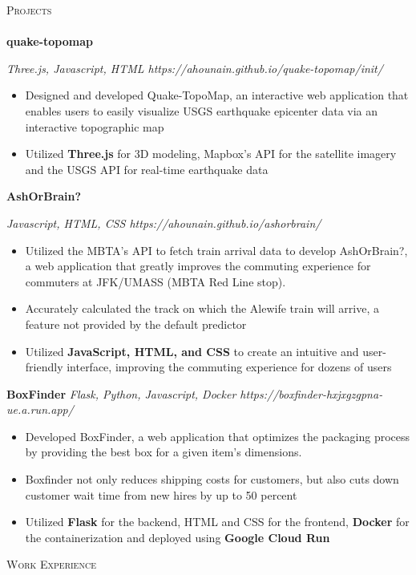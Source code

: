 \documentclass[a4paper]{article}
\newcommand{\lineunder} {
    \vspace*{-8pt} \\
    \hspace*{-18pt} \hrulefill \\
}
\newcommand{\header} [1] {
    {\hspace*{-18pt}\vspace*{6pt} \textsc{#1}}
    \vspace*{-6pt} \lineunder
}
\begin{document}
\header{Projects}
{\textbf{quake-topomap}} {\sl Three.js, Javascript, HTML \hfill https://ahounain.github.io/quake-topomap/init/\\
\begin{itemize} 
	\item Designed and developed Quake-TopoMap, an interactive web application that enables users to easily visualize USGS earthquake epicenter data via an interactive topographic map
	\item Utilized \textbf{Three.js} for 3D modeling, Mapbox's API for the satellite imagery and the USGS API for real-time earthquake data
\end{itemize}
\vspace*{2mm}
{\textbf{AshOrBrain?}} {\sl Javascript, HTML, CSS \hfill https://ahounain.github.io/ashorbrain/\\
\begin{itemize}
	\item Utilized the MBTA's API to fetch train arrival data to develop AshOrBrain?, a web application that greatly improves the commuting experience for commuters at JFK/UMASS (MBTA Red Line stop).
	\item Accurately calculated the track on which the Alewife train will arrive, a feature not provided by the default predictor
	\item Utilized \textbf{JavaScript, HTML, and CSS} to create an intuitive and user-friendly interface, improving the commuting experience for dozens of users
	\end{itemize}
\vspace*{2mm}

{\textbf{BoxFinder}} {\sl Flask, Python, Javascript, Docker \hfill https://boxfinder-hxjxgzgpna-ue.a.run.app/  } \\
\begin{itemize}
	\item Developed BoxFinder, a web application that optimizes the packaging process by providing the best box for a given item's dimensions. 		
	\item Boxfinder not only reduces shipping costs for customers, but also cuts down customer wait time from new hires by up to 50 percent	
	\item	 Utilized {\textbf{Flask}} for the backend, HTML and CSS for the frontend,  {\textbf{Docker}} for the containerization and deployed using {\textbf{Google Cloud Run}}

\end{itemize}
\vspace*{2mm}
\header{Work Experience}
\vspace{1mm}

}}
\end{document}
